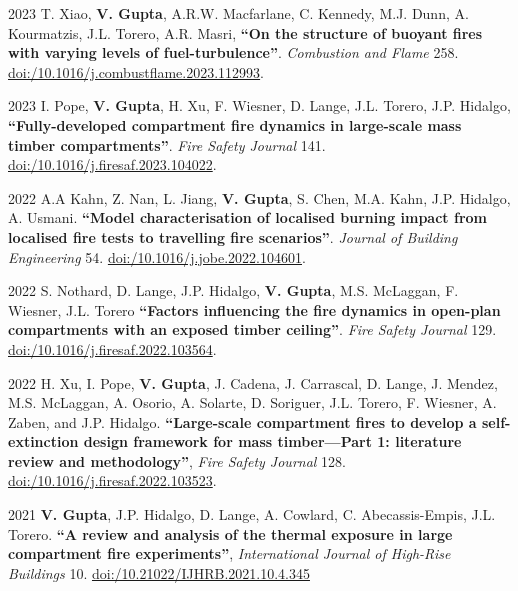 \documentclass[12pt,letterpaper]{report}
\begin{document}
\begin{tablist}
 	\item[2023] \tab T. Xiao, \textbf{V. Gupta}, A.R.W. Macfarlane, C. Kennedy, M.J. Dunn, A. Kourmatzis, J.L. Torero, A.R. Masri, \textbf{\enquote{On the structure of buoyant fires with varying levels of fuel-turbulence}}. \textit{Combustion and Flame} 258. \href{https://doi.org/10.1016/j.combustflame.2023.112993}{doi:/10.1016/j.combustflame.2023.112993}.

	\item[2023] \tab I. Pope, \textbf{V. Gupta}, H. Xu, F. Wiesner, D. Lange, J.L. Torero, J.P. Hidalgo, \textbf{\enquote{Fully-developed compartment fire dynamics in large-scale mass timber compartments}}. \textit{Fire Safety Journal} 141. \href{https://doi.org/10.1016/j.firesaf.2023.104022}{doi:/10.1016/j.firesaf.2023.104022}.
        
	\item[2022] \tab A.A Kahn, Z. Nan,  L. Jiang, \textbf{V. Gupta}, S. Chen, M.A. Kahn, J.P. Hidalgo, A. Usmani. \textbf{\enquote{Model characterisation of localised burning impact from localised fire tests to travelling fire scenarios}}. \textit{Journal of Building Engineering} 54. \href{https://doi.org/10.1016/j.jobe.2022.104601}{doi:/10.1016/j.jobe.2022.104601}.

	\item[2022] \tab S. Nothard, D. Lange, J.P. Hidalgo, \textbf{V. Gupta}, M.S. McLaggan, F. Wiesner, J.L. Torero \textbf{\enquote{Factors influencing the fire dynamics in open-plan compartments with an exposed timber ceiling}}. \textit{Fire Safety Journal} 129. \href{https://doi.org/10.1016/j.firesaf.2022.103564}{doi:/10.1016/j.firesaf.2022.103564}.
    	
	\item[2022] \tab H. Xu, I. Pope, \textbf{V. Gupta}, J. Cadena, J. Carrascal, D. Lange, J. Mendez, M.S. McLaggan, A. Osorio, A. Solarte, D. Soriguer, J.L. Torero, F. Wiesner, A. Zaben, and J.P. Hidalgo. \textbf{\enquote{Large-scale compartment fires to develop a self-extinction design framework for mass timber—Part 1: literature review and methodology}}, \textit{Fire Safety Journal} 128. \href{https://doi.org/10.1016/j.firesaf.2022.103523}{doi:/10.1016/j.firesaf.2022.103523}.   	

	\item[2021] \tab \textbf{V. Gupta}, J.P. Hidalgo, D. Lange, A. Cowlard, C. Abecassis-Empis, J.L. Torero. \textbf{\enquote{A review and analysis of the thermal exposure in large compartment fire experiments}}, \textit{International Journal of High-Rise Buildings} 10. \href{https://doi.org/10.21022/IJHRB.2021.10.4.345}{doi:/10.21022/IJHRB.2021.10.4.345}


\end{tablist}
\end{document}
